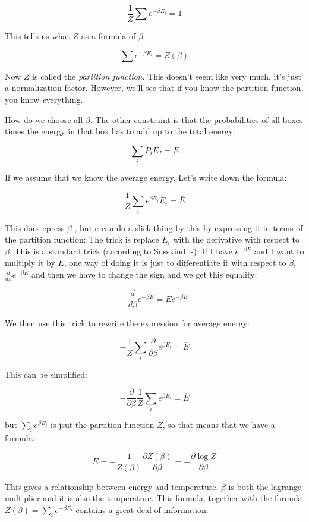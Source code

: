 \documentclass[a4, 12pt, english, USenglish]{scrreprt}
\newcommand{\idx}[1]{{\em #1}\index{#1}}
\begin{document}
\[
\frac{1}{Z} \sum e^{-\beta E_i} = 1
\]

This tells us what \(Z\) as a formula of \(\beta\)


\[
\sum e^{-\beta E_i} = Z(\beta)
\]

Now \(Z\) is called the \idx{partition function}.  This doesn't seem
like very much, it's just a normalization factor.  However, we'll see
that if you know the partition function, you know {\idx everything}.


How do we choose all \(\beta\).  The other constraint is that the
probabilities of all boxes times the energy in that box has to add up
to the total energy:

\[
\sum_i P_i E_I = \bar{E}
\]

If we assume that we know the average energy.  Let's write down the
formula:

\[
  \frac{1}{Z}\sum_i e^{\beta E_i} E_i = \bar{E}
\]

This does epress \(\beta\) , but e can do a slick thing by this by
expressing it in terms of the partition function:   The trick is
replace \(E_i\) with the derivative with respect to \(\beta\).   This
is a standard trick (according to Susskind ;-): If I have \(e^{-\beta
  E}\) and I want to multiply it by \(E\), one way of doing it is just
to differentiate it with respect to \(\beta\), \(\frac{d}{d\beta}
e^{-\beta E}\) and then we have to change the sign and we get this
equality:

\[
-\frac{d}{d\beta}e^{-\beta E} = E e^{-\beta E}
\]

We then use this trick to rewrite the expression for average energy:


\[
  - \frac{1}{Z}\sum_i \frac{\partial}{\partial\beta} e^{\beta E_i} = \bar{E}
\]

This can be simplified:

\[
  -\frac{\partial}{\partial\beta}  \frac{1}{Z}\sum_i e^{\beta E_i} =  \bar{E} 
\]

but \(\sum_i e^{\beta E_i}\) is jsut the partition function \(Z\), so that
means that we have a formula:

\[
\bar{E} = -\frac{1}{Z(\beta)} \frac{\partial Z(\beta)}{\partial
  \beta} = - \frac{\partial\log Z}{\partial\beta}
\]


This gives a relationship between energy and temperature.  
\(\beta\) is both the lagrange multiplier and it is also the
temperature.  This formula, together with the formula \(Z(\beta) =
\sum_i e^{-\beta E_i}\) contains a great deal of information.
\end{document}
